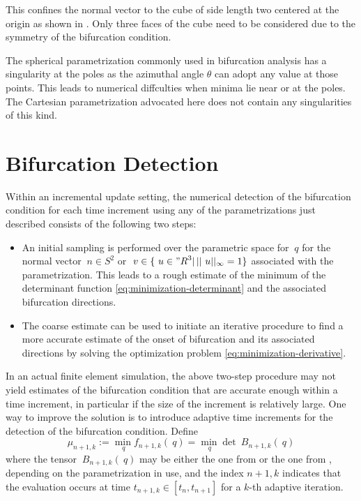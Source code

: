 \documentclass[12pt]{article}
\numberwithin{equation}{section}
\begin{document}
This confines the normal vector to the cube of side length two
centered at the origin as shown in . Only three
faces of the cube need to be considered due to the symmetry of the
bifurcation condition.

The spherical parametrization commonly used in bifurcation analysis
has a singularity at the poles as the azimuthal angle $\theta$ can
adopt any value at those points. This leads to numerical diffculties
when minima lie near or at the poles. The Cartesian parametrization
advocated here does not contain any singularities of this kind.

\section{Bifurcation Detection}
\label{sec:detection}

Within an incremental update setting, the numerical detection of the
bifurcation condition for each time increment using any of the
parametrizations just described consists of the following two steps:

\begin{itemize}

\item An initial sampling is performed over the parametric space for
  $~q$ for the normal vector $~n \in S^2$ or $~v \in \{ ~u \in {"R}^3
  | \, ||~u||_\infty = 1\}$ associated with the parametrization. This
  leads to a rough estimate of the minimum of the determinant function
  \eqref{eq:minimization-determinant} and the associated bifurcation
  directions.

\item The coarse estimate can be used to initiate an iterative
  procedure to find a more accurate estimate of the onset of
  bifurcation and its associated directions by solving the
  optimization problem \eqref{eq:minimization-derivative}.

\end{itemize}

In an actual finite element simulation, the above two-step procedure
may not yield estimates of the bifurcation condition that are accurate
enough within a time increment, in particular if the size of the
increment is relatively large. One way to improve the solution is to
introduce adaptive time increments for the detection of the
bifurcation condition.  Define
\begin{equation} \label{eq:general-minimization-problem}
  \mu_{n+1,k} := \min_{~q} f_{n+1,k}(~q) = \min_{~q} \det ~B_{n+1,k}(~q)
\end{equation}
where the tensor $~B_{n+1,k}(~q)$ may be either the one from
 or the one from
, depending on the parametrization
in use, and the index ${n+1,k}$ indicates that the evaluation occurs
at time $t_{n+1,k} \in [t_n, t_{n+1}]$ for a $k$-th adaptive
iteration.
\end{document}
